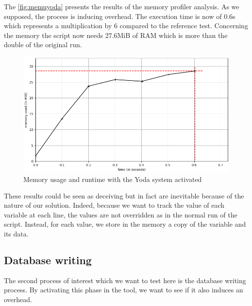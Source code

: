 The \autoref{fig:memuyoda} presents the results of the memory profiler analysis. As we supposed, the process is inducing overhead. The execution time is now of 0.6s which represents a multiplication by 6 compared to the reference test. Concerning the memory the script now needs 27.6MiB of RAM which is more than the double of the original run.
\begin{figure}[h!]
  \centering
    \includegraphics[width=\textwidth]{figures/experiments_figure_yoda.png}
    \caption{Memory usage and runtime with the Yoda system activated}
    \label{fig:memuyoda}
\end{figure}

These results could be seen as deceiving but in fact are inevitable because of the nature of our solution. Indeed, because we want to track the value of each variable at each line, the values are not overridden as in the normal run of the script. Instead, for each value, we store in the memory a copy of the variable and its data.

\subsection{Database writing}
The second process of interest which we want to test here is the database writing process. By activating this phase in the tool, we want to see if it also induces an overhead. 

